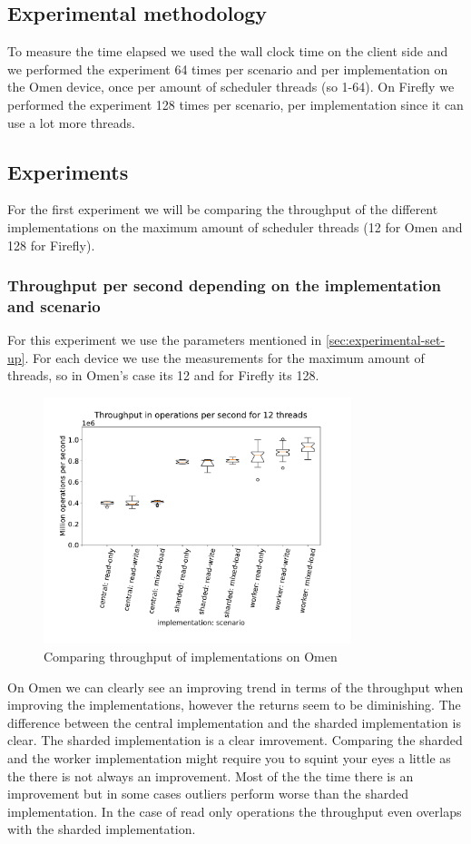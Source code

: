 \documentclass{article}
\begin{document}
\subsection{Experimental methodology}
To measure the time elapsed we used the wall clock time on the client side and we performed the
experiment 64 times per scenario and per implementation on the Omen device, once
per amount of scheduler threads (so 1-64). On Firefly we performed the
experiment 128 times per scenario, per implementation since it can use a lot
more threads.
\subsection{Experiments}
For the first experiment we will be comparing the throughput of the different
implementations on the maximum amount of scheduler threads (12 for Omen and 128
for Firefly).
\subsubsection{Throughput per second depending on the implementation and
	scenario}
For this experiment we use the parameters mentioned in
\autoref{sec:experimental-set-up}. For each device we use the measurements for
the maximum amount of threads, so in Omen's case its 12 and for Firefly its 128.
\begin{figure}[H]
	\centering
	\includegraphics[width=0.8\textwidth]{boxplots/boxplot-throughput-in-operations-per-second-for-12-threads.pdf}
	\caption{Comparing throughput of implementations on Omen}
	\label{fig:throughput-compare-impl-omen}
\end{figure}
On Omen we can clearly see an improving trend in terms of the throughput when
improving the implementations, however the returns seem to be diminishing. The
difference between the central implementation and the sharded implementation is
clear. The sharded implementation is a clear imrovement. Comparing the sharded
and the worker implementation might require you to squint your eyes a little as
the there is not always an improvement. Most of the the time there is an
improvement but in some cases outliers perform worse than the sharded
implementation. In the case of read only operations the throughput even overlaps
with the sharded implementation.
\end{document}
